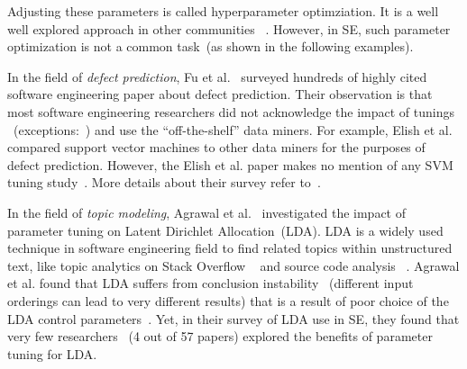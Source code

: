 \documentclass[sigconf]{acmart}
\theoremstyle{break}
\begin{document}
Adjusting these parameters
is called hyperparameter optimziation.
It is a well   well explored approach in other communities ~\cite{bergstra2012random,li2016hyperband}. However, in SE,
such parameter optimization is not a common task~(as shown in the following examples).





In the field of {\em defect prediction}, 
Fu et al.~\cite{fu2016tuning}  surveyed hundreds of highly 
cited software engineering paper about defect prediction. 
Their observation is that most software engineering  researchers
did not acknowledge the impact of tunings 
~(exceptions:~\cite{lessmann2008benchmarking,tantithamthavorn2016automated}) and
use the ``off-the-shelf'' data miners. For example, 
Elish et al.~\cite{elish2008predicting} compared support vector machines
to other data miners for the purposes of defect prediction.
However, the Elish et al. paper makes no mention of any SVM tuning study~\cite{elish2008predicting}. More details about their survey 
refer to~\cite{fu2016tuning}.

In the field of {\em topic modeling}, Agrawal et al.~\cite{agrawal2016wrong} investigated 
the impact of parameter tuning on Latent Dirichlet Allocation~(LDA).
LDA 
  is a widely used technique in software engineering field
to find related topics within unstructured text, 
like topic analytics on Stack Overflow ~\cite{barua2014developers}
and source code analysis ~\cite{binkley2014understanding}.
 Agrawal et al. found that LDA suffers from conclusion instability
~(different input orderings can lead to very different results)
that is a result of poor choice of the LDA control parameters~\cite{agrawal2016wrong}. 
Yet, in their survey of LDA use in SE, they found that very few  
researchers ~(4 out of 57 papers) explored the benefits of parameter tuning for LDA.
\end{document}
